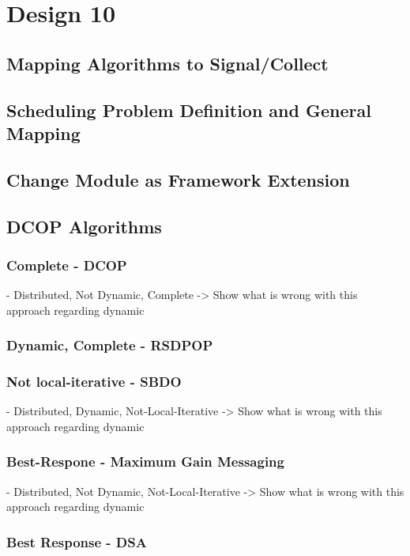 \chapter{Design 10}
\section{Mapping Algorithms to Signal/Collect}
\section{Scheduling Problem Definition and General Mapping}
\section{Change Module as Framework Extension}

\section{DCOP Algorithms}
\subsection{Complete - DCOP}

- Distributed, Not Dynamic, Complete -> Show what is wrong with this approach regarding dynamic

\subsection{Dynamic, Complete - RSDPOP}

\subsection{Not local-iterative - SBDO}

- Distributed, Dynamic, Not-Local-Iterative -> Show what is wrong with this approach regarding dynamic

\subsection{Best-Respone - Maximum Gain Messaging}

- Distributed, Not Dynamic, Not-Local-Iterative -> Show what is wrong with this approach regarding dynamic

\subsection{Best Response - DSA}

